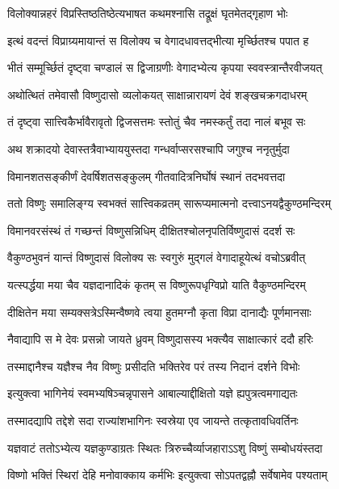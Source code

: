 \twolineshloka
{विलोक्यान्नहरं विप्रस्तिष्ठतिष्ठेत्यभाषत}
{कथमश्नासि तद्रूक्षं घृतमेतद्गृहाण भोः} %

\twolineshloka
{इत्थं वदन्तं विप्राग्र्यमायान्तं स विलोक्य च}
{वेगादधावत्तद्भीत्या मृर्च्छितश्च पपात ह} %

\twolineshloka
{भीतं सम्मूर्च्छितं दृष्ट्वा चण्डालं स द्विजाग्रणीः}
{वेगादभ्येत्य कृपया स्ववस्त्रान्तैरवीजयत्} %

\twolineshloka
{अथोत्थितं तमेवासौ विष्णुदासो व्यलोकयत्}
{साक्षान्नारायणं देवं शङ्खचक्रगदाधरम्} %

\twolineshloka
{तं दृष्ट्वा सात्त्विकैर्भावैरावृतो द्विजसत्तमः}
{स्तोतुं चैव नमस्कर्तुं तदा नालं बभूव सः} %

\twolineshloka
{अथ शक्रादयो देवास्तत्रैवाभ्याययुस्तदा}
{गन्धर्वाप्सरसश्चापि जगुश्च ननृतुर्मुदा} %

\twolineshloka
{विमानशतसङ्कीर्णं देवर्षिशतसङ्कुलम्}
{गीतवादित्रनिर्घोषं स्थानं तदभवत्तदा} %

\twolineshloka
{ततो विष्णुः समालिङ्ग्य स्वभक्तं सात्त्विकव्रतम्}
{सारूप्यमात्मनो दत्त्वाऽनयद्वैकुण्ठमन्दिरम्} %

\twolineshloka
{विमानवरसंस्थं तं गच्छन्तं विष्णुसन्निधिम्}
{दीक्षितश्चोलनृपतिर्विष्णुदासं ददर्श सः} %

\twolineshloka
{वैकुण्ठभुवनं यान्तं विष्णुदासं विलोक्य सः}
{स्वगुरुं मुद्गलं वेगादाहूयेत्थं वचोऽब्रवीत्} %


\twolineshloka
{यत्स्पर्द्धया मया चैव यज्ञदानादिकं कृतम्}
{स विष्णुरूपधृग्विप्रो याति वैकुण्ठमन्दिरम्} %

\twolineshloka
{दीक्षितेन मया सम्यक्सत्रेऽस्मिन्वैष्णवे त्वया}
{हुतमग्नौ कृता विप्रा दानाद्यैः पूर्णमानसाः} %

\twolineshloka
{नैवाद्यापि स मे देवः प्रसन्नो जायते ध्रुवम्}
{विष्णुदासस्य भक्त्यैव साक्षात्कारं ददौ हरिः} %

\twolineshloka
{तस्माद्दानैश्च यज्ञैश्च नैव विष्णुः प्रसीदति}
{भक्तिरेव परं तस्य निदानं दर्शने विभोः} %


\twolineshloka
{इत्युक्त्वा भागिनेयं स्वमभ्यषिञ्चन्नृपासने}
{आबाल्याद्दीक्षितो यज्ञे ह्यपुत्रत्वमगाद्यतः} %


\twolineshloka
{तस्मादद्यापि तद्देशे सदा राज्यांशभागिनः}
{स्वस्रेया एव जायन्ते तत्कृतावधिवर्तिनः} %

\twolineshloka
{यज्ञवाटं ततोऽभ्येत्य यज्ञकुण्डाग्रतः स्थितः}
{त्रिरुच्चैर्व्याजहाराऽऽशु विष्णुं सम्बोधयंस्तदा} %

\twolineshloka
{विष्णो भक्तिं स्थिरां देहि मनोवाक्काय कर्मभिः}
{इत्युक्त्वा सोऽपतद्वह्नौ सर्वेषामेव पश्यताम्} %

